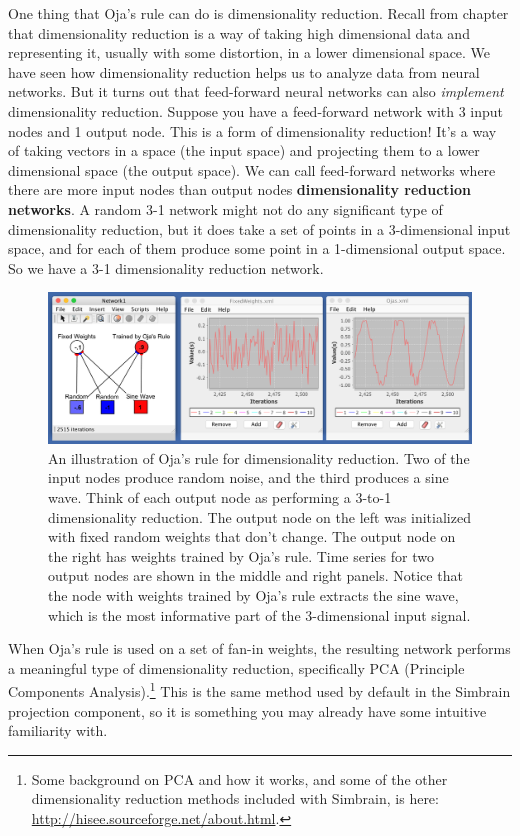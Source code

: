 One thing that Oja's rule can do is dimensionality reduction. Recall from chapter  that dimensionality reduction is a way of taking high dimensional data and representing it, usually with some distortion, in a lower dimensional space. We have seen how dimensionality reduction helps us to analyze data from neural networks. But it turns out that feed-forward neural networks can also \emph{implement} dimensionality reduction. Suppose you have a feed-forward network with 3 input nodes and 1 output node. This is a form of dimensionality reduction!  It's a way of taking vectors in a space (the input space) and projecting them to a lower dimensional space (the output space). We can call feed-forward networks where there are more input nodes than output nodes \textbf{dimensionality reduction networks}. A random 3-1 network might  not do any significant type of dimensionality reduction, but it does take a set of points in a 3-dimensional input space, and for each of them produce some point in a 1-dimensional output space. So we have a 3-1 dimensionality reduction network. 

\begin{figure}[h]
\centering
\includegraphics[scale=.4]{./images/OjasRule.png}
\caption[Simbrain screenshot]{An illustration of Oja's rule for dimensionality reduction. Two of the input nodes produce random noise, and the third produces a sine wave. Think of each output node as performing a 3-to-1 dimensionality reduction. The output node on the left was initialized with fixed random weights that don't change. The output node on the right has weights trained by Oja's rule. Time series for two output nodes are shown in the middle and right panels. Notice that the node with weights trained by Oja's rule extracts the sine wave, which is the most informative part of the 3-dimensional input signal.}
\label{oja_dim_reduction}
\end{figure}

When Oja's rule is used on a set of fan-in weights, the resulting network performs a meaningful type of dimensionality reduction, specifically PCA (Principle Components Analysis).\footnote{Some background on PCA and how it works, and some of the other dimensionality reduction methods included with Simbrain, is here: \url{http://hisee.sourceforge.net/about.html}.}   This is the same method used by default in the Simbrain projection component, so it is something you may already have some intuitive familiarity with. 

